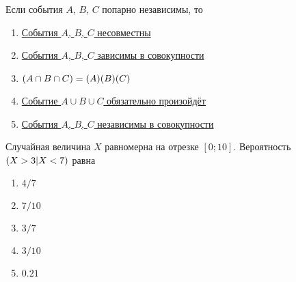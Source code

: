 \documentclass[t]{beamer}
\let\P\relax
\DeclareMathOperator{\P}{\mathbb{P}}
\begin{document}
 \begin{frame} \label{5} 
\begin{block}{5} 

Если события $A$, $B$, $C$ попарно независимы, то


 \end{block} 
\begin{enumerate} 
\item[] \hyperlink{5-No}{\beamergotobutton{} События $A$, $B$, $C$ несовместны}
\item[] \hyperlink{5-No}{\beamergotobutton{} События $A$, $B$, $C$ зависимы в совокупности}
\item[] \hyperlink{5-No}{\beamergotobutton{} $\P(A\cap B\cap C)=\P(A)\P(B)\P(C)$
}
\item[] \hyperlink{5-No}{\beamergotobutton{} Событие $A\cup B\cup C$ обязательно произойдёт}
\item[] \hyperlink{5-No}{\beamergotobutton{} События $A$, $B$, $C$ независимы в совокупности}
\end{enumerate} 
\end{frame} 


 \begin{frame} \label{6} 
\begin{block}{6} 

Случайная величина $X$ равномерна на отрезке $[0;10]$. Вероятность $\P(X>3|X<7)$ равна
     


 \end{block} 
\begin{enumerate} 
\item[] \hyperlink{6-Yes}{\beamergotobutton{} $4/7$}
\item[] \hyperlink{6-No}{\beamergotobutton{} $7/10$}
\item[] \hyperlink{6-No}{\beamergotobutton{} $3/7$}
\item[] \hyperlink{6-No}{\beamergotobutton{} $3/10$}
\item[] \hyperlink{6-No}{\beamergotobutton{} $0.21$
}
\end{enumerate} 
\end{frame} 
\end{document}
